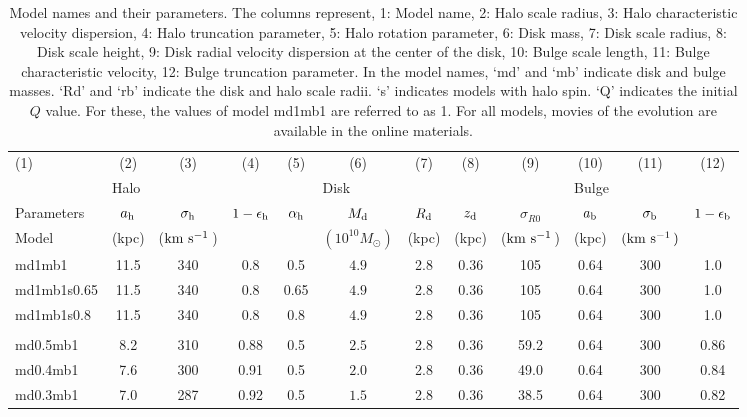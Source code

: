 \begin{table*}
\begin{center}
  \caption{Model names and their parameters.  The columns represent,
    1: Model name, 2: Halo scale radius, 3: Halo characteristic
    velocity dispersion, 4: Halo truncation parameter, 5: Halo
    rotation parameter, 6: Disk mass, 7: Disk scale radius, 8: Disk
    scale height, 9: Disk radial velocity dispersion at the center of
    the disk, 10: Bulge scale length, 11: Bulge characteristic
    velocity, 12: Bulge truncation parameter.  In the model names,
    `md' and `mb' indicate disk and bulge masses. `Rd' and `rb'
    indicate the disk and halo scale radii. `s' indicates models with
    halo spin. `Q' indicates the initial $Q$ value. For these, the
    values of model md1mb1 are referred to as 1.  For all models,
    movies of the evolution are available in the online materials.
\label{tb:params}
}
\begin{tabular}{lccccccccccc}
  \hline
  (1)      &   (2)      &   (3)      &   (4)      &   (5)      &   (6)      &   (7)      &   (8)      &   (9)      &   (10)      &   (11)      &   (12)      \\ 
           &  \multicolumn{4}{l}{Halo} &  \multicolumn{4}{l}{Disk} &  \multicolumn{3}{l}{Bulge} \\
Parameters &  $a_{\rm h}$ & $\sigma_{\rm h}$ & $1-\epsilon_{\rm h}$ & $\alpha_{\rm h}$& $M_{\rm d}$ & $R_{\rm d}$ & $z_{\rm d}$ & $\sigma_{R0}$  & $a_{\rm b}$ & $\sigma_{\rm b}$ & $1-\epsilon_{\rm b}$ \\ 
Model   &  (kpc) & ($\mathrm{km\ s^{-1}}\,$) &  &  & $(10^{10}M_{\odot})$ & (kpc) & (kpc) & ($\mathrm{km\ s^{-1}}\,$)  & (kpc) & $(\mathrm{km\ s^{-1}}\,)$\\
\hline \hline
md1mb1        &11.5 &  340 & 0.8 & 0.5 & $4.9$ & 2.8 & 0.36 & 105  & 0.64 & 300 & 1.0 \\
md1mb1s0.65    &11.5 &  340 & 0.8 & 0.65 & $4.9$ & 2.8 & 0.36 & 105  & 0.64 & 300 & 1.0 \\
md1mb1s0.8    &11.5 &  340 & 0.8 & 0.8 & $4.9$ & 2.8 & 0.36 & 105  & 0.64 & 300 & 1.0 \\
\\
md0.5mb1  & 8.2 &  310 & 0.88 & 0.5 & $2.5$ & 2.8 & 0.36 & 59.2  & 0.64 & 300 & 0.86 \\
md0.4mb1  & 7.6 &  300 & 0.91 & 0.5 & $2.0$ & 2.8 & 0.36 & 49.0  & 0.64 & 300 & 0.84 \\
md0.3mb1  & 7.0 &  287 & 0.92 & 0.5 & $1.5$ & 2.8 & 0.36 & 38.5  & 0.64 & 300 & 0.82 \\

\end{tabular}
\end{center}
\end{table*}

